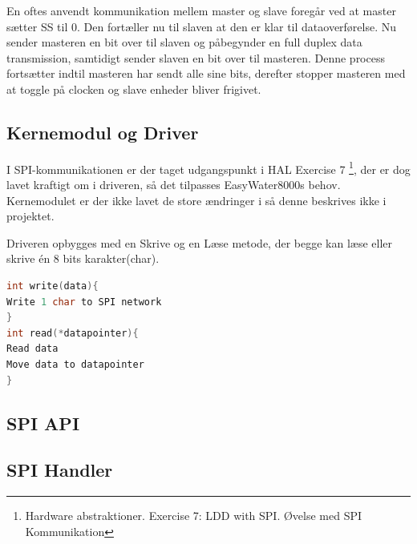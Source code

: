 En oftes anvendt kommunikation mellem master og slave foregår ved at master sætter SS til 0. Den fortæller nu til slaven at den er klar til 
dataoverførelse. Nu sender masteren en bit over til slaven og påbegynder en full duplex data transmission, samtidigt sender slaven en bit over
til masteren. Denne process fortsætter indtil masteren har sendt alle sine bits, derefter stopper masteren med at toggle på clocken og slave 
enheder bliver frigivet.

\subsection{Kernemodul og Driver}

I SPI-kommunikationen er der taget udgangspunkt i HAL Exercise 7 \footnote{Hardware abstraktioner. Exercise 7: LDD with SPI. Øvelse med SPI Kommunikation}, der er dog lavet kraftigt om i driveren, så det tilpasses EasyWater8000s behov. Kernemodulet er der ikke lavet de store ændringer i så denne beskrives ikke i projektet.

Driveren opbygges med en Skrive og en Læse metode, der begge kan læse eller skrive én 8 bits karakter(char).

\begin{lstlisting}[language=C]
int write(data){
Write 1 char to SPI network
}
int read(*datapointer){
Read data
Move data to datapointer
}
\end{lstlisting}


\subsection{SPI API}




\subsection{SPI Handler}
